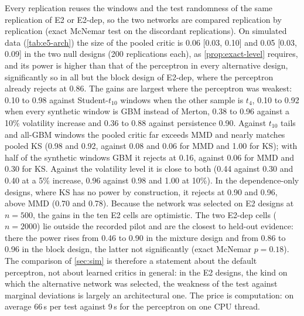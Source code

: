 Every replication reuses the windows and the test randomness of the same replication of E2 or
E2-dep, so the two networks are compared replication by replication (exact McNemar test on the
discordant replications). On simulated data (\cref{tab:e5-arch}) the size of the pooled critic is
0.06 [0.03, 0.10] and 0.05 [0.03, 0.09] in the two null designs (200 replications each), as
\cref{prop:exact-level} requires, and its power is higher than that of the perceptron in every
alternative design, significantly so in all but the block design of E2-dep, where the perceptron
already rejects at 0.86. The gains are largest where the perceptron was weakest: 0.10 to 0.98
against Student-$t_{10}$ windows when the other sample is $t_4$, 0.10 to 0.92 when every
synthetic window is GBM instead of Merton, 0.38 to 0.96 against a 10\% volatility increase and
0.36 to 0.88 against persistence 0.90. Against $t_{10}$ tails and all-GBM windows the pooled
critic far exceeds MMD and nearly matches pooled KS (0.98 and 0.92, against 0.08 and 0.06 for MMD
and 1.00 for KS); with half of the synthetic windows GBM it rejects at 0.16, against 0.06 for MMD
and 0.30 for KS. Against the volatility level it is close to both (0.44 against 0.30 and 0.40 at
a 5\% increase, 0.96 against 0.98 and 1.00 at 10\%). In the dependence-only designs,
where KS has no power by construction, it rejects at 0.90 and 0.96, above MMD (0.70 and 0.78).
Because the network was selected on E2 designs at $n=500$, the gains in the ten E2 cells are
optimistic. The two E2-dep cells ($n=2000$) lie outside the recorded pilot and are the closest
to held-out evidence: there the power rises from 0.46 to 0.90 in the mixture design and from 0.86
to 0.96 in the block design, the latter not significantly (exact McNemar $p=0.18$). The
comparison of \cref{sec:sim} is therefore a statement about the default perceptron, not about
learned critics in general: in the E2 designs, the kind on which the alternative network was
selected, the weakness of the \WC{} test against marginal deviations is largely an architectural
one. The price is computation: on average 66\,s
per test against 9\,s for the perceptron on one CPU thread.

